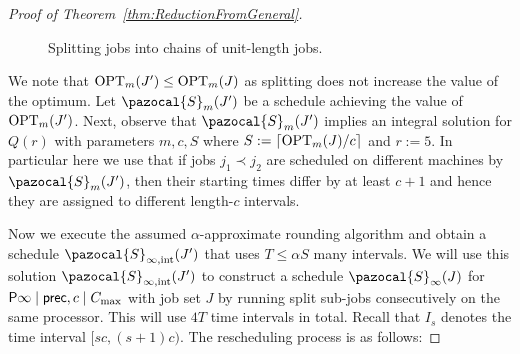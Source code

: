 \begin{proof}[Proof of Theorem~\ref{thm:ReductionFromGeneral}]
\begin{figure}
\begin{center}
 \caption{Splitting jobs into chains of unit-length jobs.\label{fig:SplittingJobsIntoUnitLengthJobs}}
  \end{center}
  \end{figure}
  We note that $\textnormal{OPT}_m(J') \leq \textnormal{OPT}_m(J)$ as splitting does not increase the value of the optimum.
  Let $\pazocal{S}_m(J')$ be a schedule achieving the value of $\textnormal{OPT}_m(J')$.
  Next, observe that $\pazocal{S}_m(J')$ implies an integral solution for $Q(r)$ with parameters $m,c,S$ where $S := \lceil \textnormal{OPT}_m(J)/c \rceil$ and $r := 5$.
  In particular here we use that if jobs $j_1 \prec j_2$ are scheduled on different machines by $\pazocal{S}_m(J')$, then their starting times differ by at least $c+1$ and hence they are assigned to different length-$c$ intervals.
  
  Now we execute the assumed $\alpha$-approximate rounding algorithm and obtain a schedule $\pazocal{S}_{\infty,\text{int}}(J')$
  that uses $T \leq \alpha S$ many intervals. 
  We will use this solution  $\pazocal{S}_{\infty,\text{int}}(J')$ to construct
   a schedule $\pazocal{S}_{\infty}(J)$ for $\mathsf{P}\infty \mid \mathsf{prec},c \mid C_{\max}$ 
  with job set $J$ by running split sub-jobs consecutively on the same processor. 
  This will use $4T$ time intervals in total. Recall that $I_s$ denotes the time interval $[sc, (s+1)c)$.
  The rescheduling process is as follows:
	

\end{proof}
